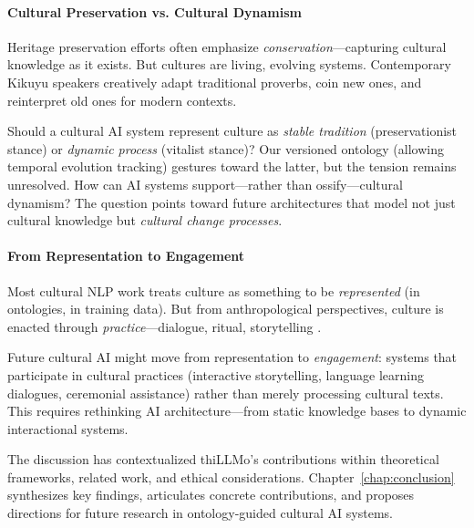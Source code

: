 \paragraph{Cultural Preservation vs. Cultural Dynamism}

Heritage preservation efforts often emphasize \emph{conservation}—capturing cultural knowledge as it exists. But cultures are living, evolving systems. Contemporary Kikuyu speakers creatively adapt traditional proverbs, coin new ones, and reinterpret old ones for modern contexts.

Should a cultural AI system represent culture as \emph{stable tradition} (preservationist stance) or \emph{dynamic process} (vitalist stance)? Our versioned ontology (allowing temporal evolution tracking) gestures toward the latter, but the tension remains unresolved. How can AI systems support—rather than ossify—cultural dynamism? The question points toward future architectures that model not just cultural knowledge but \emph{cultural change processes}.

\paragraph{From Representation to Engagement}

Most cultural NLP work treats culture as something to be \emph{represented} (in ontologies, in training data). But from anthropological perspectives, culture is enacted through \emph{practice}—dialogue, ritual, storytelling \citep{bourdieu1977outline}.

Future cultural AI might move from representation to \emph{engagement}: systems that participate in cultural practices (interactive storytelling, language learning dialogues, ceremonial assistance) rather than merely processing cultural texts. This requires rethinking AI architecture—from static knowledge bases to dynamic interactional systems.

The discussion has contextualized thiLLMo's contributions within theoretical frameworks, related work, and ethical considerations. Chapter~\ref{chap:conclusion} synthesizes key findings, articulates concrete contributions, and proposes directions for future research in ontology-guided cultural AI systems.
